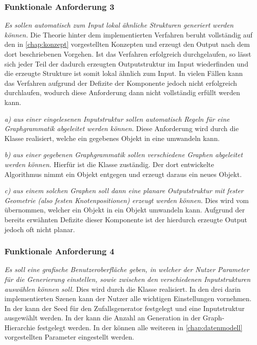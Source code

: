 \subsubsection{Funktionale Anforderung 3}
\textit{Es sollen automatisch zum Input lokal ähnliche Strukturen generiert werden können.} Die Theorie hinter dem implementierten Verfahren beruht
vollständig auf den in \autoref{chap:konzept} vorgestellten Konzepten und erzeugt den Output nach dem dort beschriebenen Vorgehen. Ist das Verfahren
erfolgreich durchgelaufen, so lässt sich jeder Teil der dadurch erzeugten Outputstruktur im Input wiederfinden und die erzeugte Strukture ist somit
lokal ähnlich zum Input. In vielen Fällen kann das Verfahren aufgrund der Defizite der  Komponente jedoch nicht erfolgreich durchlaufen,
wodurch diese Anforderung dann nicht vollständig erfüllt werden kann.

\textit{a) aus einer eingelesenen Inputstruktur sollen automatisch Regeln für eine Graphgrammatik abgeleitet werden können.} Diese Anforderung wird
durch die Klasse  realisiert, welche ein gegebenes  Objekt in eine  umwandeln kann.

\textit{b) aus einer gegebenen Graphgrammatik sollen verschiedene Graphen abgeleitet werden können.} Hierfür ist die  Klasse zuständig.
Der dort entwickelte Algorithmus nimmt ein  Objekt entgegen und erzeugt daraus ein neues  Objekt.

\textit{c) aus einem solchen Graphen soll dann eine planare Outputstruktur mit fester Geometrie (also festen Knotenpositionen) erzeugt werden können.}
Dies wird vom  übernommen, welcher ein  Objekt in ein  Objekt umwandeln kann. Aufgrund der bereits
erwähnten Defizite dieser Komponente ist der hierdurch erzeugte Output jedoch oft nicht planar.

\subsubsection{Funktionale Anforderung 4}
\textit{Es soll eine grafische Benutzeroberfläche geben, in welcher der Nutzer Parameter für die Generierung einstellen, sowie zwischen
den verschiedenen Inputstrukturen auswählen können soll.} Dies wird durch die Klasse  realisiert. In den drei darin
implementierten Szenen kann der Nutzer alle wichtigen Einstellungen vornehmen. In der  kann der Seed für den Zufallsgenerator festgelegt
und eine Inputstruktur ausgewählt werden. In der  kann die Anzahl an Generation in der Graph-Hierarchie festgelegt werden. In der
 können alle weiteren in \autoref{chap:datenmodell} vorgestellten Parameter eingestellt werden.

